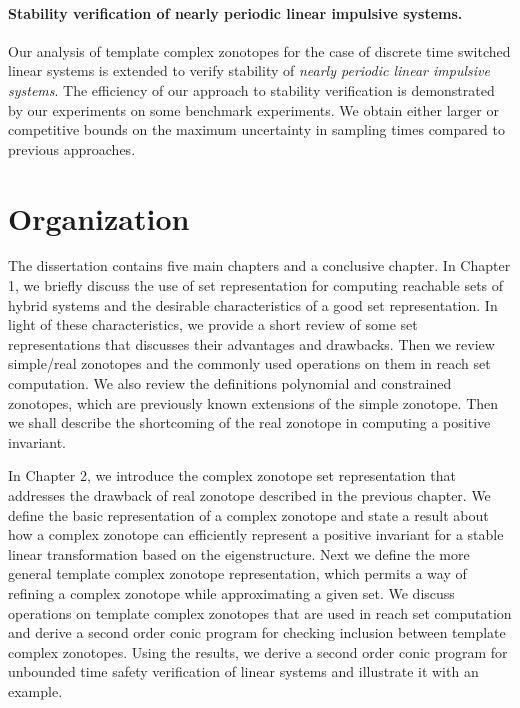 \documentclass[11pt,a4paper,twoside,openright]{article}
\begin{document}
\paragraph{Stability verification of nearly periodic linear impulsive
  systems.}  %
  Our analysis of template complex zonotopes for the case of discrete
  time switched linear systems is extended to verify stability of {\it
    nearly periodic linear impulsive systems}.  The efficiency of our
  approach to stability verification is demonstrated by our
  experiments on some benchmark experiments.  We obtain either larger
  or competitive bounds on the maximum uncertainty in sampling times
  compared to previous approaches.

\section {Organization}
The dissertation contains five main chapters and a conclusive chapter.
In Chapter 1, we briefly discuss the use of set representation for
computing reachable sets of hybrid systems and the desirable
characteristics of a good set representation.  In light of these
characteristics, we provide a short review of some set representations
that discusses their advantages and drawbacks.  Then we review
simple/real zonotopes and the commonly used operations on them in
reach set computation.  We also review the definitions polynomial and
constrained zonotopes, which are previously known extensions of the
simple zonotope.  Then we shall describe the shortcoming of the real
zonotope in computing a positive invariant.

In Chapter 2, we introduce the complex zonotope set representation
that addresses the drawback of real zonotope described in the previous
chapter.  We define the basic representation of a complex zonotope and
state a result about how a complex zonotope can efficiently represent
a positive invariant for a stable linear transformation based on the
eigenstructure.  Next we define the more general template complex
zonotope representation, which permits a way of refining a complex
zonotope while approximating a given set.  We discuss operations on
template complex zonotopes that are used in reach set computation and
derive a second order conic program for checking inclusion between
template complex zonotopes.  Using the results, we derive a second
order conic program for unbounded time safety verification of linear
systems and illustrate it with an example.
\end{document}
